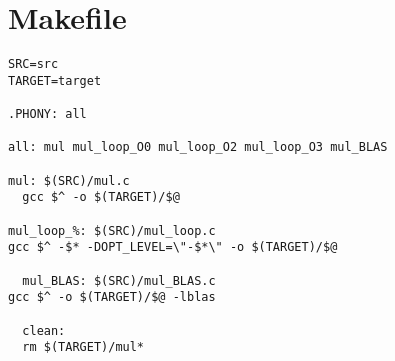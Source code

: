 \documentclass[12pt]{article}
\begin{document}
\begin{mdframed}
  \vspace{3em}

\end{mdframed}

\appendix

\section{Makefile}
\label{sec:makefile}
\begin{lstlisting}
SRC=src
TARGET=target

.PHONY: all

all: mul mul_loop_O0 mul_loop_O2 mul_loop_O3 mul_BLAS

mul: $(SRC)/mul.c
  gcc $^ -o $(TARGET)/$@

mul_loop_%: $(SRC)/mul_loop.c
gcc $^ -$* -DOPT_LEVEL=\"-$*\" -o $(TARGET)/$@

  mul_BLAS: $(SRC)/mul_BLAS.c
gcc $^ -o $(TARGET)/$@ -lblas

  clean:
  rm $(TARGET)/mul*
\end{lstlisting}
\end{document}
